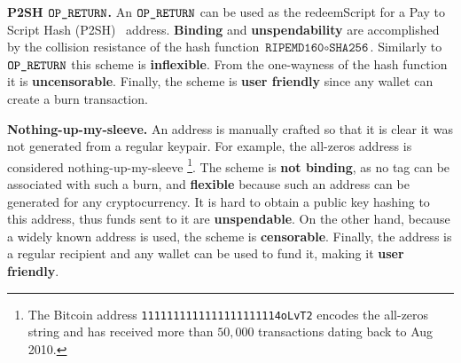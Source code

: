 \noindent
\textbf{P2SH $\texttt{OP\_RETURN}$.}
An $\texttt{OP\_RETURN}$ can be used as the redeemScript for a Pay to Script Hash (P2SH)~\cite{p2sh} address.
\textbf{Binding} and \textbf{unspendability} are accomplished by the collision resistance of the hash function $\texttt{RIPEMD160} \circ \texttt{SHA256}$.
Similarly to $\texttt{OP\_RETURN}$ this scheme is \textbf{inflexible}.
From the one-wayness of the hash function it is \textbf{uncensorable}.
Finally, the scheme is \textbf{user friendly} since any wallet can create a burn transaction.

\noindent
\textbf{Nothing-up-my-sleeve.}
An address is manually crafted so that it is clear it was not generated from a regular keypair.
For example, the all-zeros address is considered nothing-up-my-sleeve
\footnote{The Bitcoin address \texttt{1111111111111111111114oLvT2} encodes the all-zeros string and has received more than $50{,}000$ transactions dating back to Aug 2010.}.
The scheme is \textbf{not binding}, as no tag can be associated with such a burn, and \textbf{flexible} because such an address can be generated for any cryptocurrency.
It is hard to obtain a public key hashing to this address, thus funds sent to it are \textbf{unspendable}.
On the other hand, because a widely known address is used, the scheme is \textbf{censorable}.
Finally, the address is a regular recipient and any wallet can be used to fund it, making it \textbf{user friendly}.
